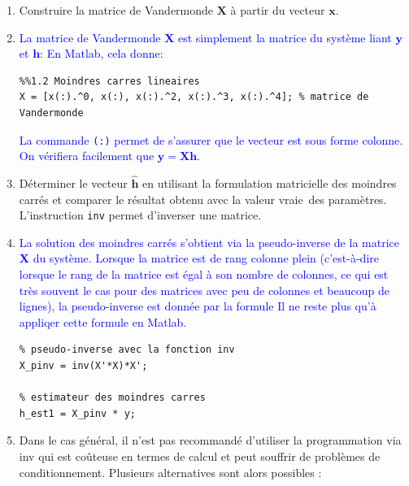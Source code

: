 \begin{enumerate}
\item Construire la matrice de Vandermonde $\bm{X}$ à partir du vecteur $\bm{x}$.
	
\item[\textcolor{blue}{Solution.}] \textcolor{blue}{La matrice de Vandermonde $\bm{X}$ est simplement la matrice du système liant $\bm{y}$ et $\bm{h}$:
En Matlab, cela donne:}
\begin{lstlisting}
%%1.2 Moindres carres lineaires
X = [x(:).^0, x(:), x(:).^2, x(:).^3, x(:).^4]; % matrice de Vandermonde
\end{lstlisting}
\textcolor{blue}{La commande \texttt{(:)} permet de s'assurer que le vecteur est sous forme colonne. On vérifiera facilement que $\bm{y} = \bm{X}\bm{h}$.}
	
	\item Déterminer le vecteur $\hat{\bm{h}}$ en utilisant la formulation matricielle des moindres carrés et comparer le résultat obtenu avec la valeur \guillemotleft vraie\guillemotright\, des paramètres. L'instruction \texttt{inv} permet d'inverser une matrice.
	\item[\textcolor{blue}{Solution.}] \textcolor{blue}{La solution des moindres carrés s'obtient via la pseudo-inverse de la matrice $\bm{X}$ du système. Lorsque la matrice est de rang colonne plein (c'est-à-dire lorsque le rang de la matrice est égal à son nombre de colonnes, ce qui est très souvent le cas pour des matrices avec peu de colonnes et beaucoup de lignes), la pseudo-inverse est donnée par la formule
	Il ne reste plus qu'à appliqer cette formule en Matlab.}
\begin{lstlisting}
% pseudo-inverse avec la fonction inv
X_pinv = inv(X'*X)*X';

% estimateur des moindres carres
h_est1 = X_pinv * y;	
\end{lstlisting}
	
	\item Dans le cas général, il n'est pas recommandé d'utiliser la programmation via inv qui est coûteuse en termes de calcul et peut souffrir de problèmes de conditionnement. Plusieurs alternatives sont alors possibles :
	

\end{enumerate}

